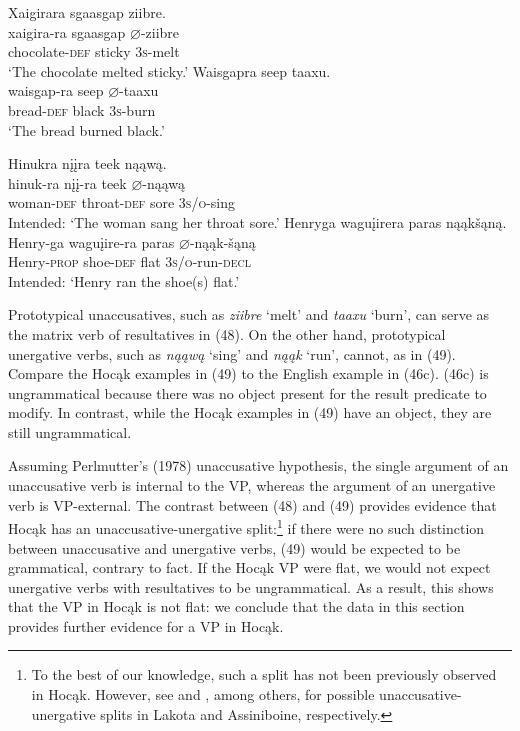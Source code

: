 \documentclass[output=paper]{LSP/langsci}
\begin{document}
\begin{exe}
\ex
\begin{xlist}
\ex 
\glll Xaigirara			sgaasgap		ziibre.\\
xaigira-ra			sgaasgap		$\varnothing$-ziibre \\
	chocolate-\textsc{def}	sticky			\textsc{3s}-melt \\
\trans `The chocolate melted sticky.'
\ex 
\glll Waisgapra		seep		taaxu.\\
waisgap-ra		seep		$\varnothing$-taaxu \\
	bread-\textsc{def}		black		\textsc{3s}-burn \\
\trans `The bread burned black.'
\end{xlist}
\end{exe}
\begin{exe}
\ex
\begin{xlist}
\ex 
\glll *Hinukra			n\k{i}\k{i}ra				teek	nąąwą.\\
hinuk-ra			n\k{i}\k{i}-ra				teek	$\varnothing$-nąąwą \\
		woman-\textsc{def}	 throat-\textsc{def}	sore	\textsc{3s/o}-sing \\
\trans Intended: `The woman sang her throat sore.'
\ex 
\glll *Henryga			wagu\k{i}irera		paras		nąąk\v{s}ąną.\\
Henry-ga		wagu\k{i}ire-ra	paras		$\varnothing$-nąąk-\v{s}ąną \\
		Henry-\textsc{prop}	shoe-\textsc{def}			flat			\textsc{3s/o}-run-\textsc{decl} \\
\trans Intended: `Henry ran the shoe(s) flat.'
\end{xlist}
\end{exe}

Prototypical unaccusatives, such as \textit{ziibre} `melt' and \textit{taaxu} `burn', can serve as the matrix verb of resultatives in (48). On the other hand, prototypical unergative verbs, such as \textit{nąąwą} `sing' and \textit{nąąk} `run', cannot, as in (49). Compare the Hocąk examples in (49) to the English example in (46c). (46c) is ungrammatical because there was no object present for the result predicate to modify. In contrast, while the Hocąk examples in (49) have an object, they are still ungrammatical.
	
Assuming Perlmutter's (1978) unaccusative hypothesis, the single argument of an unaccusative verb is internal to the VP, whereas the argument of an unergative verb is VP-external. The contrast between (48) and (49) provides evidence that Hocąk has an unaccusative-unergative split:\footnote{To the best of our knowledge, such a split has not been previously observed in Hocąk. However, see \citet{Williamson1984} and \citet{West2003}, among others, for possible unaccusative-unergative splits in Lakota and Assiniboine, respectively.}  if there were no such distinction between unaccusative and unergative verbs, (49) would be expected to be grammatical, contrary to fact. If the Hocąk VP were flat, we would not expect unergative verbs with resultatives to be ungrammatical. As a result, this shows that the VP in Hocąk is not flat: we conclude that the data in this section provides further evidence for a VP in Hocąk.
\end{document}
